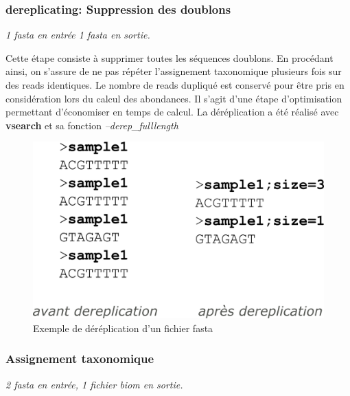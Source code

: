 \documentclass[12pt,a4paper]{article}
\begin{document}
\subsubsection{dereplicating: Suppression des doublons}\begin{center}\emph{1 fasta en entrée 1 fasta en sortie. } \end{center}

Cette étape consiste à supprimer toutes les séquences doublons. En procédant ainsi, on s'assure de ne pas répéter l'assignement taxonomique plusieurs fois sur des reads identiques. Le nombre de reads dupliqué est conservé pour être pris en considération lors du calcul des abondances. Il s'agit d'une étape d'optimisation permettant d'économiser en temps de calcul. La déréplication a été réalisé avec \textbf{vsearch} et sa fonction \textit{--derep\_fulllength }

\begin{figure}[ht]
\begin{center}
\includegraphics[scale=0.4]{img/dereplication.png}\hfill
\end{center}
\caption{Exemple de déréplication d'un fichier fasta}
\label{dereplication}
\end{figure}

\subsubsection{Assignement taxonomique} \begin{center}\emph{2 fasta en entrée,  1 fichier biom  en sortie. }\end{center} 
\end{document}
